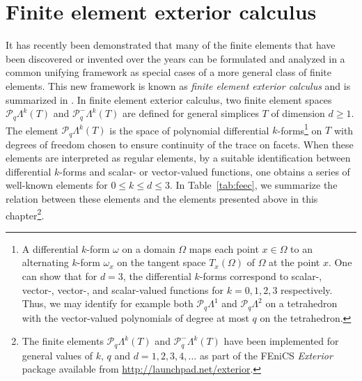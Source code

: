 \section{Finite element exterior calculus}

It has recently been demonstrated that many of the finite elements
that have been discovered or invented over the years can be formulated
and analyzed in a common unifying framework as special cases of a more
general class of finite elements. This new framework is known as
\emph{finite element exterior calculus} and is summarized
in \citet{ArnoldFalkWinther2006}. In finite element exterior calculus,
two finite element spaces $\mathcal{P}_q\Lambda^k(T)$ and
$\mathcal{P}_q^-\Lambda^k(T)$ are defined for general simplices $T$ of
dimension $d \geqslant1$. The element $\mathcal{P}_q\Lambda^k(T)$ is
the space of polynomial differential $k$-forms\footnote{A differential
  $k$-form $\omega$ on a domain $\Omega$ maps each point $x \in
  \Omega$ to an alternating $k$-form $\omega_x$ on the tangent space
  $T_x(\Omega)$ of $\Omega$ at the point $x$. One can show that for
  $d=3$, the differential $k$-forms correspond to scalar-, vector-,
  vector-, and scalar-valued functions for $k=0,1,2,3$
  respectively. Thus, we may identify for example both
  $\mathcal{P}_q\Lambda^1$ and $\mathcal{P}_q\Lambda^2$ on a
  tetrahedron with the vector-valued polynomials of degree at most $q$
  on the tetrahedron.} on $T$ with degrees of freedom chosen to ensure
continuity of the trace on facets. When these elements are interpreted
as regular elements, by a suitable identification between differential
$k$-forms and scalar- or vector-valued functions, one obtains a series
of well-known elements for $0\leqslant k \leqslant d \leqslant 3$. In
Table~\ref{tab:feec}, we summarize the relation between these elements
and the elements presented above in this chapter\footnote{The finite
  elements $\mathcal{P}_q\Lambda^k(T)$ and
  $\mathcal{P}_q^-\Lambda^k(T)$ have been implemented for general
  values of $k$, $q$ and $d=1,2,3,4,\ldots$ as part of the FEniCS
  \emph{Exterior} package available from
  \url{http://launchpad.net/exterior}.}.

